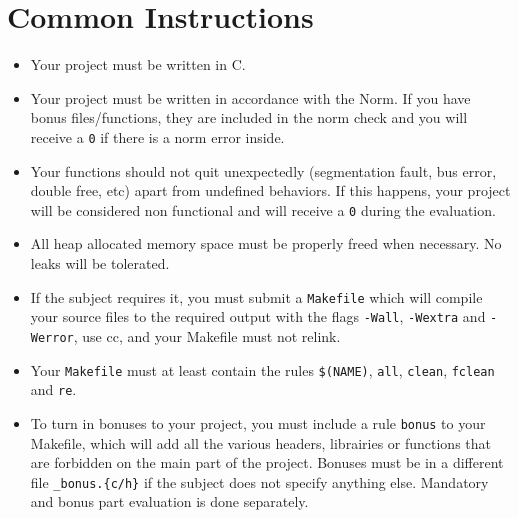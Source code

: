 
\chapter{Common Instructions}
    \begin{itemize}

      \item Your project must be written in C.

      \item Your project must be written in accordance with the Norm.
        If you have bonus files/functions, they are included in the norm check
        and you will receive a \texttt{0} if there is a norm error inside.

      \item Your functions should not quit unexpectedly (segmentation
        fault, bus error, double free, etc) apart from undefined
        behaviors. If this happens, your project will be considered non
        functional and will receive a \texttt{0} during the evaluation.

      \item All heap allocated memory space must be properly freed
        when necessary. No leaks will be tolerated.

      \item If the subject requires it, you must submit a \texttt{Makefile}
        which will compile your source files to the required output
        with the flags \texttt{-Wall}, \texttt{-Wextra} and \texttt{-Werror},
        use cc, and your Makefile must not relink.

      \item Your \texttt{Makefile} must at least contain the rules
        \texttt{\$(NAME)}, \texttt{all}, \texttt{clean},
        \texttt{fclean} and \texttt{re}.

      \item To turn in bonuses to your project, you must include a rule
        \texttt{bonus} to your Makefile, which will add all the various headers, 
        librairies or functions that are forbidden on the main part of the project. 
        Bonuses must be in a different file \texttt{\*\_bonus.\{c/h\}} if the subject does not specify anything else.
	Mandatory and bonus part evaluation is done separately.


\end{itemize}
